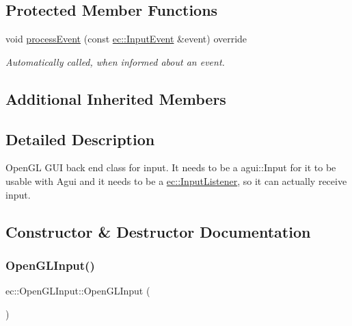 \subsection*{Protected Member Functions}
\begin{DoxyCompactItemize}
\item 
void \mbox{\hyperlink{classec_1_1_open_g_l_input_a064a4e318e18d79ad8df19c789f84686}{process\+Event}} (const \mbox{\hyperlink{structec_1_1_input_event}{ec\+::\+Input\+Event}} \&event) override
\begin{DoxyCompactList}\small\item\em Automatically called, when informed about an event. \end{DoxyCompactList}\end{DoxyCompactItemize}
\subsection*{Additional Inherited Members}


\subsection{Detailed Description}
Open\+GL G\+UI back end class for input. It needs to be a agui\+::\+Input for it to be usable with Agui and it needs to be a \mbox{\hyperlink{classec_1_1_input_listener}{ec\+::\+Input\+Listener}}, so it can actually receive input. 

\subsection{Constructor \& Destructor Documentation}
\mbox{\label{classec_1_1_open_g_l_input_a7046406475d576873c287a64ea4d3cb6}} 
\subsubsection{\texorpdfstring{Open\+G\+L\+Input()}{OpenGLInput()}}
{\footnotesize\ttfamily ec\+::\+Open\+G\+L\+Input\+::\+Open\+G\+L\+Input (\begin{DoxyParamCaption}{ }\end{DoxyParamCaption})\hspace{0.3cm}{\ttfamily [explicit]}}

